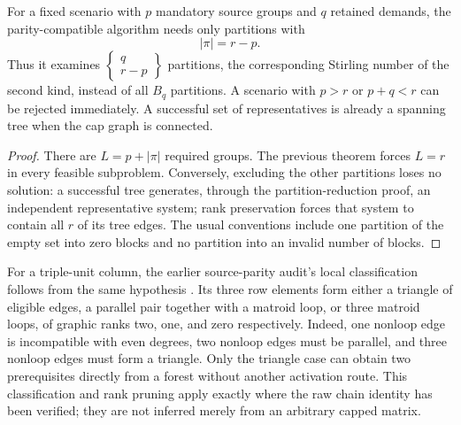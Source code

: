 \begin{corollary}
\label{cor:fpt-stirling-layer}
For a fixed scenario with $p$ mandatory source groups and $q$ retained
demands, the parity-compatible algorithm needs only partitions with
\[
                            |\pi|=r-p.
\]
Thus it examines $\left\{\begin{smallmatrix}q\\r-p\end{smallmatrix}\right\}$
partitions, the corresponding Stirling number of the second kind,
instead of all $B_q$ partitions. A scenario with $p>r$ or $p+q<r$
can be rejected immediately. A successful set of representatives is
already a spanning tree when the cap graph is connected.
\end{corollary}
\begin{proof}
There are $L=p+|\pi|$ required groups. The previous theorem forces
$L=r$ in every feasible subproblem. Conversely, excluding the other
partitions loses no solution: a successful tree generates, through the
partition-reduction proof, an independent representative system; rank
preservation forces that system to contain all $r$ of its tree edges.
The usual conventions include one partition of the empty set into zero
blocks and no partition into an invalid number of blocks.
\end{proof}

For a triple-unit column, the earlier source-parity audit's local
classification follows from the same hypothesis \cite{repo-dual-normalization}. Its three row elements form either a triangle of eligible edges, a
parallel pair together with a matroid loop, or three matroid loops, of
graphic ranks two, one, and zero respectively. Indeed, one nonloop edge is incompatible
with even degrees, two nonloop edges must be parallel, and three
nonloop edges must form a triangle. Only the triangle case can obtain
two prerequisites directly from a forest without another activation
route. This classification and rank pruning apply exactly where the
raw chain identity has been verified; they are not inferred merely from
an arbitrary capped matrix.
